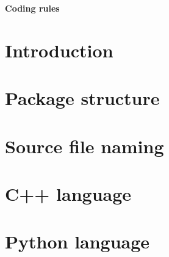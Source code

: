 \documentclass[11pt]{article}
\begin{document}
\begin{titlepage}
  \vspace*{2cm}
  \begin{center}
    {\huge \bf Coding rules}
    
  \end{center}
\end{titlepage}

\newpage


\cleardoublepage
\tableofcontents
\cleardoublepage


\cleardoublepage

\section{Introduction}

\cleardoublepage

\section{Package structure}

\cleardoublepage

\section{Source file naming}

\cleardoublepage

\section{C++ language}

\cleardoublepage

\section{Python language}

\cleardoublepage


\nocite{*}

\cleardoublepage

\printindex
\end{document}
